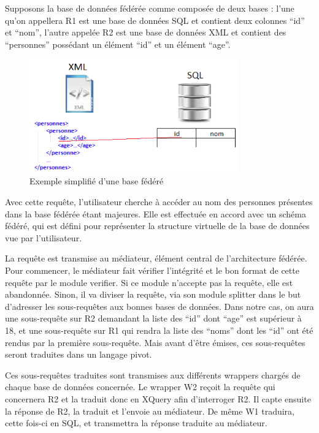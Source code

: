 Supposons la base de données fédérée comme composée de deux bases : l’une qu’on appellera R1 est une base de données SQL et contient deux colonnes “id” et “nom”, l’autre appelée R2 est une base de données XML et contient des “personnes” possédant un élément “id” et un élément “age”. 

\begin{figure}[h!]
    \centering
    \includegraphics[width=0.8\textwidth]{ressources/graphiques/xmlAndSql_simple_example.png}
    \caption{Exemple simplifié d'une base fédéré}
\end{figure}


Avec cette requête, l’utilisateur cherche à accéder au nom des personnes présentes dans la base fédérée étant majeures. Elle est effectuée en accord avec un schéma fédéré, qui est défini pour représenter la structure virtuelle de la base de données vue par l’utilisateur.

La requête est transmise au médiateur, élément central de l’architecture fédérée. Pour commencer, le médiateur fait vérifier l’intégrité et le bon format de cette requête par le module verifier. Si ce module n’accepte pas la requête, elle est abandonnée. Sinon, il va diviser la requête, via son module splitter dans le but d’adresser les sous-requêtes aux bonnes bases de données. Dans notre cas, on aura une sous-requête sur R2 demandant la liste des “id” dont “age” est supérieur à 18, et une sous-requête sur R1 qui rendra la liste des “noms” dont les “id” ont été rendus par la première sous-requête. Mais avant d’être émises, ces sous-requêtes seront traduites dans un langage pivot.

Ces sous-requêtes traduites sont transmises aux différents wrappers chargés de chaque base de données concernée. Le wrapper W2 reçoit la requête qui concernera R2 et la traduit donc en XQuery afin d’interroger R2. Il capte ensuite la réponse de R2, la traduit et l’envoie au médiateur. De même W1 traduira, cette fois-ci en SQL, et transmettra la réponse traduite au médiateur.

